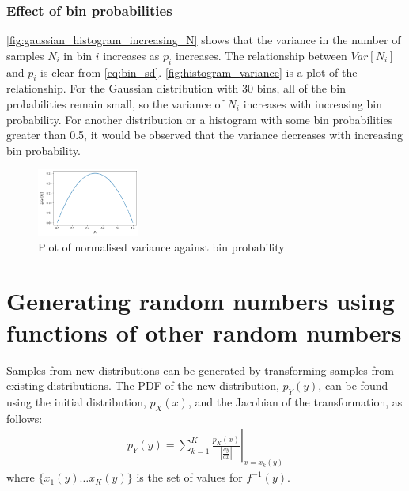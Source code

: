\documentclass[a4paper]{article}
\begin{document}

\subsubsection{Effect of bin probabilities}
\autoref{fig:gaussian_histogram_increasing_N} shows that the variance in the number of samples $N_i$ in bin $i$
increases as $p_i$ increases.
The relationship between $Var[N_i]$ and $p_i$ is clear from \autoref{eq:bin_sd}. \autoref{fig:histogram_variance} is a
plot of the relationship. For the Gaussian distribution with 30 bins, all of the bin probabilities remain small, so the
variance of $N_i$ increases with increasing bin probability. For another distribution or a histogram with some bin
probabilities greater than 0.5, it would be observed that the variance decreases with increasing bin probability.

\begin{figure}[h]
    \centering
    \includegraphics[width=0.3\textwidth]{figures/histogram_variance.png}
    \caption{Plot of normalised variance against bin probability}
    \label{fig:histogram_variance}
\end{figure}



\section{Generating random numbers using functions of other random numbers}

Samples from new distributions can be generated by transforming samples from existing distributions.
The PDF of the new distribution, $p_Y(y)$, can be found using the initial distribution, $p_X(x)$, and
the Jacobian of the transformation, as follows:
\begin{align*}
    p_Y(y) = \sum_{k=1}^K \left. \frac{p_X(x)}{\left|\frac{dy}{dx}\right|} \right|_{x=x_k(y)}
\end{align*}
where $\{x_1(y) \dots x_K(y)\}$ is the set of values for $f^{-1}(y)$.
\end{document}
